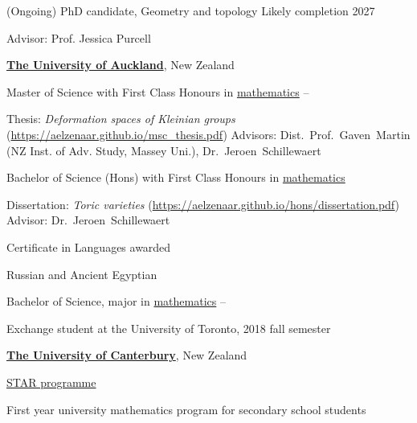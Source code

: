 \documentclass[a4paper,yyyy,nonstopmode,10pt]{simpleresumecv}
\begin{document}
\begin{Body}
\Gap
\BulletItem
(Ongoing) PhD candidate, Geometry and topology
\hfill
Likely completion 2027
\begin{Detail}
\SubBulletItem
Advisor: Prof. Jessica Purcell
\end{Detail}

\Entry
\href{http://www.auckland.ac.nz/}
{\textbf{The University of Auckland}},
New Zealand

\Gap
\BulletItem
Master of Science with First Class Honours in
\href{http://math.auckland.ac.nz/}
{mathematics}
\hfill
{}--
\begin{Detail}
\SubBulletItem
Thesis:
\textit{Deformation spaces of Kleinian groups} (\url{https://aelzenaar.github.io/msc_thesis.pdf})
\SubBulletItem
Advisors:
Dist.~Prof.~Gaven~Martin (NZ Inst. of Adv. Study, Massey Uni.),
Dr.~Jeroen~Schillewaert
\end{Detail}

\Gap
\BulletItem
Bachelor of Science (Hons) with First Class Honours
in
\href{http://math.auckland.ac.nz/}
{mathematics}
\hfill
{}
\begin{Detail}
\SubBulletItem
Dissertation:
\textit{Toric varieties} (\url{https://aelzenaar.github.io/hons/dissertation.pdf})
\SubBulletItem
Advisor:
Dr.~Jeroen~Schillewaert
\end{Detail}

\Gap
\BulletItem
Certificate in Languages
\hfill
awarded 
\begin{Detail}
\SubBulletItem
Russian and Ancient Egyptian
\end{Detail}

\Gap
\BulletItem
Bachelor of Science, major in
\href{http://math.auckland.ac.nz/}
{mathematics}
\hfill
{}--
\begin{Detail}
\SubBulletItem
Exchange student at the University of Toronto, 2018 fall semester
\end{Detail}

\Entry
\href{http://www.canterbury.ac.nz/}
{\textbf{The University of Canterbury}},
New Zealand

\Gap
\BulletItem
\href{https://www.canterbury.ac.nz/get-started/transition/star-programme/}
{STAR programme}
\hfill
{}
\begin{Detail}
\SubBulletItem
First year university mathematics program for secondary school students
\end{Detail}


\end{Body}
\end{document}

